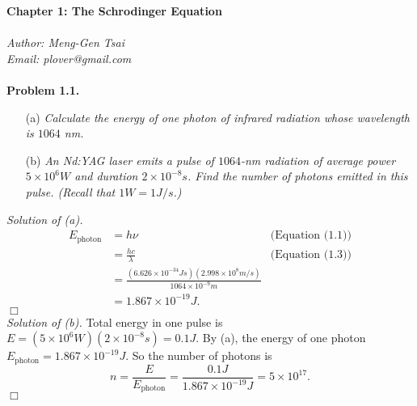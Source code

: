 \documentclass{article}
\begin{document}
\textbf{\Large Chapter 1: The Schrodinger Equation} \\\\



\emph{Author: Meng-Gen Tsai} \\
\emph{Email: plover@gmail.com} \\\\






\textbf{Problem 1.1.}
\begin{enumerate}
\item[(a)]
\emph{Calculate the energy of one photon of infrared radiation whose wavelength
is $1064$ nm.}
\item[(b)]
\emph{An Nd:YAG laser emits a pulse of $1064$-nm radiation of average power
$5 \times 10^6 W$ and duration $2 \times 10^{-8}s$.
Find the number of photons emitted in this pulse. (Recall that $1W = 1J/s$.)}
\end{enumerate}

\emph{Solution of (a).}
\begin{align*}
E_{\text{photon}}
&= h \nu
  &\text{(Equation (1.1))} \\
&= \frac{hc}{\lambda}
  &\text{(Equation (1.3))} \\
&= \frac{(6.626 \times 10^{-34}Js)(2.998 \times 10^8 m/s)}{1064 \times 10^{-9} m} \\
&= 1.867 \times 10^{-19} J.
\end{align*}
$\Box$ \\

\emph{Solution of (b).}
Total energy in one pulse is $E = (5 \times 10^6 W)(2 \times 10^{-8}s) = 0.1J$.
By (a), the energy of one photon $E_{\text{photon}} = 1.867 \times 10^{-19} J$.
So the number of photons is
$$n = \frac{E}{E_{\text{photon}}}
= \frac{0.1J}{1.867 \times 10^{-19} J}
= 5 \times 10^{17}.$$
$\Box$ \\\\



\end{document}
